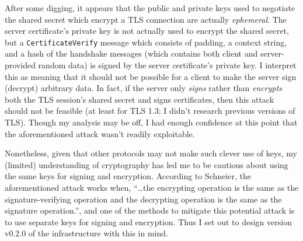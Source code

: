 \documentclass{article}
\begin{document}
After some digging, it appears that the public and private keys used to negotiate the shared secret which encrypt a TLS connection are actually \emph{ephemeral}.  The server certificate's private key is not actually used to encrypt the shared secret, but a \texttt{CertificateVerify} message which consists of padding, a context string, and a hash of the handshake messages (which contains both client and server-provided random data) is signed by the server certificate's private key.  I interpret this as meaning that it should not be possible for a client to make the server sign (decrypt) arbitrary data.  In fact, if the server only \emph{signs} rather than \emph{encrypts} both the TLS session's shared secret and signs certificates, then this attack should not be feasible (at least for TLS 1.3; I didn't research previous versions of TLS).  Though my analysis may be off, I had enough confidence at this point that the aforementioned attack wasn't readily exploitable.

Nonetheless, given that other protocols may not make such clever use of keys, my (limited) understanding of cryptography has led me to be cautious about using the same keys for signing and encryption.  According to Schneier, the aforementioned attack works when, ``\ldots the encrypting operation is the same as the signature-verifying operation and the decrypting operation is the same as the signature operation.'', and one of the methods to mitigate this potential attack is to use separate keys for signing and encryption.  Thus I set out to design version v0.2.0 of the infrastructure with this in mind.
\end{document}
